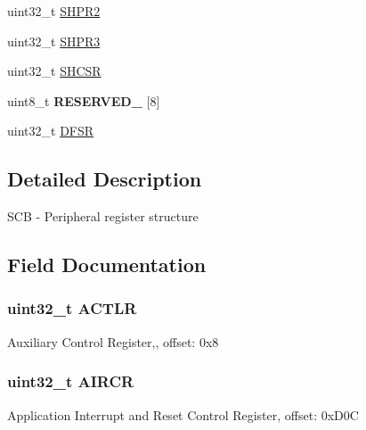 \begin{DoxyCompactItemize}
\item 
uint32\+\_\+t \hyperlink{struct_s_c_b___mem_map_a4fa6448cb8510e61433afa5f024a1579}{S\+H\+P\+R2}
\item 
uint32\+\_\+t \hyperlink{struct_s_c_b___mem_map_aa7e2c4b036de2b98b1b578b4e638978c}{S\+H\+P\+R3}
\item 
uint32\+\_\+t \hyperlink{struct_s_c_b___mem_map_aabb6b7677f7a0a50ce6fae3b63eb943d}{S\+H\+C\+S\+R}
\item 
\hypertarget{struct_s_c_b___mem_map_a86684537b595133db57a7bcc73843d2a}{}uint8\+\_\+t {\bfseries R\+E\+S\+E\+R\+V\+E\+D\+\_} \mbox{[}8\mbox{]}\label{struct_s_c_b___mem_map_a86684537b595133db57a7bcc73843d2a}

\item 
uint32\+\_\+t \hyperlink{struct_s_c_b___mem_map_ae8d2d700d6a9735423a52a48a62b50b6}{D\+F\+S\+R}
\end{DoxyCompactItemize}


\subsection{Detailed Description}
S\+C\+B -\/ Peripheral register structure 

\subsection{Field Documentation}
\hypertarget{struct_s_c_b___mem_map_afffeb2c080fb652c45dcccbc9432945c}{}
\subsubsection[{A\+C\+T\+L\+R}]{\setlength{\rightskip}{0pt plus 5cm}uint32\+\_\+t A\+C\+T\+L\+R}\label{struct_s_c_b___mem_map_afffeb2c080fb652c45dcccbc9432945c}
Auxiliary Control Register,, offset\+: 0x8 \hypertarget{struct_s_c_b___mem_map_ad69a7e2aba70bd9fa6924533a23a062a}{}
\subsubsection[{A\+I\+R\+C\+R}]{\setlength{\rightskip}{0pt plus 5cm}uint32\+\_\+t A\+I\+R\+C\+R}\label{struct_s_c_b___mem_map_ad69a7e2aba70bd9fa6924533a23a062a}
Application Interrupt and Reset Control Register, offset\+: 0x\+D0\+C \hypertarget{struct_s_c_b___mem_map_a9f5754479885a80651e6ce99ce44fbeb}{}
